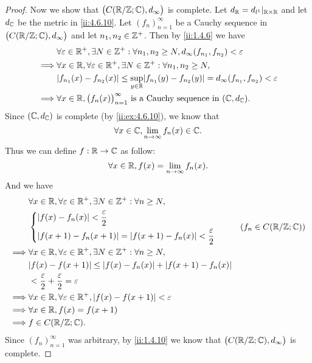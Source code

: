 \begin{proof}
  Now we show that \(\big(C(\mathbb{R} / \mathbb{Z} ; \mathbb{C}), d_\infty\big)\) is complete.
  Let \(d_{\mathbb{R}} = d_{l^1}|_{\mathbb{R} \times \mathbb{R}}\) and let \(d_{\mathbb{C}}\) be the metric in \cref{ii:4.6.10}.
  Let \((f_n)_{n = 1}^\infty\) be a Cauchy sequence in \(\big(C(\mathbb{R} / \mathbb{Z} ; \mathbb{C}), d_\infty\big)\) and let \(n_1, n_2 \in \mathbb{Z}^+\).
  Then by \cref{ii:1.4.6} we have
  \begin{align*}
             & \forall \varepsilon \in \R^+, \exists N \in \Z^+ : \forall n_1, n_2 \geq N, d_\infty(f_{n_1}, f_{n_2}) < \varepsilon        \\
    \implies & \forall x \in \R, \forall \varepsilon \in \R^+, \exists N \in \Z^+ : \forall n_1, n_2 \geq N,                               \\
             & \abs{f_{n_1}(x) - f_{n_2}(x)} \leq \sup_{y \in \R} \abs{f_{n_1}(y) - f_{n_2}(y)} = d_\infty(f_{n_1}, f_{n_2}) < \varepsilon \\
    \implies & \forall x \in \R, \big(f_n(x)\big)_{n = 1}^\infty \text{ is a Cauchy sequence in } (\C, d_{\C}).
  \end{align*}
  Since \((\mathbb{C}, d_{\mathbb{C}})\) is complete (by \cref{ii:ex:4.6.10}), we know that
  \[
    \forall x \in \mathbb{C}, \lim_{n \to \infty} f_n(x) \in \mathbb{C}.
  \]
  Thus we can define \(f : \mathbb{R} \to \mathbb{C}\) as follow:
  \[
    \forall x \in \mathbb{R}, f(x) = \lim_{n \to \infty} f_n(x).
  \]
  And we have
  \begin{align*}
             & \forall x \in \R, \forall \varepsilon \in \R^+, \exists N \in \Z^+ : \forall n \geq N, \\
             & \begin{dcases}
                 \abs{f(x) - f_n(x)} < \dfrac{\varepsilon}{2} \\
                 \abs{f(x + 1) - f_n(x + 1)} = \abs{f(x + 1) - f_n(x)} < \dfrac{\varepsilon}{2}
               \end{dcases}         & (f_n \in C(\R / \Z ; \C))          \\
    \implies & \forall x \in \R, \forall \varepsilon \in \R^+, \exists N \in \Z^+ : \forall n \geq N, \\
             & \abs{f(x) - f(x + 1)} \leq \abs{f(x) - f_n(x)} + \abs{f(x + 1) - f_n(x)}               \\
             & < \dfrac{\varepsilon}{2} + \dfrac{\varepsilon}{2} = \varepsilon                        \\
    \implies & \forall x \in \R, \forall \varepsilon \in \R^+, \abs{f(x) - f(x + 1)} < \varepsilon    \\
    \implies & \forall x \in \R, f(x) = f(x + 1)                                                      \\
    \implies & f \in C(\R / \Z ; \C).
  \end{align*}
  Since \((f_n)_{n = 1}^\infty\) was arbitrary, by \cref{ii:1.4.10} we know that \(\big(C(\mathbb{R} / \mathbb{Z} ; \mathbb{C}), d_\infty\big)\) is complete.
\end{proof}
